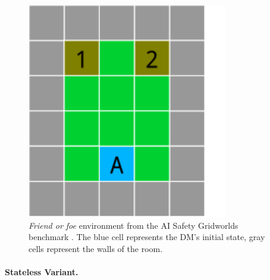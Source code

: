 \begin{figure}
   \centering
   \includegraphics[scale=0.5]{figures/friend-or-foeCUT}
   \caption{\emph{Friend or foe} environment from the AI Safety Gridworlds benchmark \parencite{leike2017ai}.
   The blue cell 
represents the DM's initial state, gray cells represent the walls of the room.   } \label{fig:friendorfoe}
 \end{figure}


\paragraph{Stateless Variant.}\label{sec:statv}

